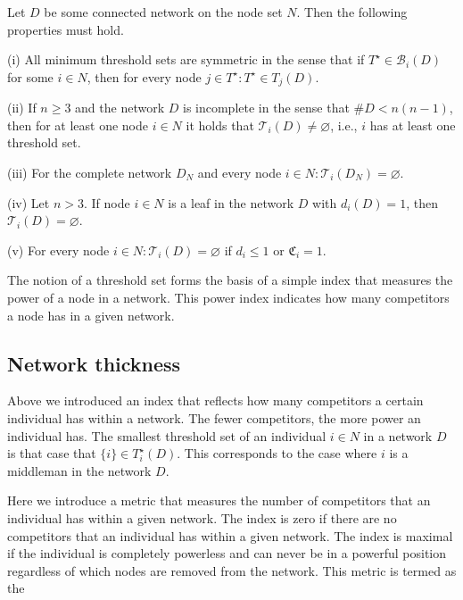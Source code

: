 \begin{proposition}
Let $D$ be some connected network on the node set $N$. Then the following properties must hold.

\begin{abet}
\item[(i)] All minimum threshold sets are symmetric in the sense that if $T^{\star} \in \mathcal{B}_{i}(D)$ for some $i \in N$, then for every node $j \in T^{\star} \colon T^{\star} \in T_{j}(D)$.

\item[(ii)] If $n \geqslant 3$ and the network $D$ is incomplete in the sense that $\# D < n(n-1)$, then for at least one node $i \in N$ it holds that $\mathcal{T}_{i}(D) \neq \varnothing$, i.e., $i$ has at least one threshold set.

\item[(iii)] For the complete network $D_{N}$ and every node $i \in N \colon \mathcal{T}_{i} (D_{N}) = \varnothing$.

\item[(iv)] Let $n > 3$. If node $i \in N$ is a leaf in the network $D$ with $d_{i}(D) = 1$, then $\mathcal{T}_{i}(D) = \varnothing$.

\item[(v)] For every node $i \in N \colon \mathcal{T}_{i} (D) = \varnothing$ if $d_{i} \leqslant 1$ or $\mathfrak{C}_{i}=1$.
\end{abet}
\end{proposition}

The notion of a threshold set forms the basis of a simple index that measures the power of a node in a network. This power index indicates how many competitors a node has in a given network.

\subsection{Network thickness}

Above we introduced an index that reflects how many competitors a certain individual has within a network. The fewer competitors, the more power an individual has. The smallest threshold set of an individual $i \in N$ in a network $D$ is that case that $\{i\} \in T_{i}^{\star}(D)$. This corresponds to the case where $i$ is a middleman in the network $D$.

Here we introduce a metric that measures the number of competitors that an individual has within a given network. The index is zero if there are no competitors that an individual has within a given network. The index is maximal if the individual is completely powerless and can never be in a powerful position regardless of which nodes are removed from the network. This metric is termed as the 

